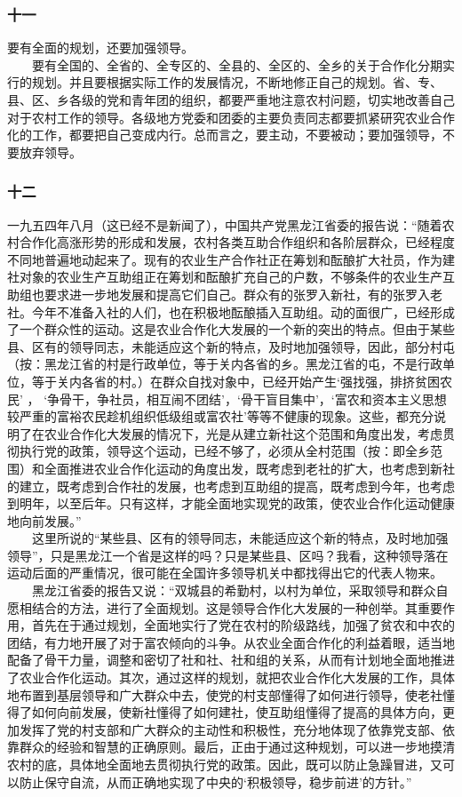 \documentclass[cn,11pt,chinese]{elegantbook}
\def\myformat#1{\hfil\hfil #1}
\begin{document}
\subsubsection*{\myformat{十一}}
要有全面的规划，还要加强领导。\\
　　要有全国的、全省的、全专区的、全县的、全区的、全乡的关于合作化分期实行的规划。并且要根据实际工作的发展情况，不断地修正自己的规划。省、专、县、区、乡各级的党和青年团的组织，都要严重地注意农村问题，切实地改善自己对于农村工作的领导。各级地方党委和团委的主要负责同志都要抓紧研究农业合作化的工作，都要把自己变成内行。总而言之，要主动，不要被动；要加强领导，不要放弃领导。\\
\subsubsection*{\myformat{十二}}
一九五四年八月（这已经不是新闻了），中国共产党黑龙江省委的报告说：“随着农村合作化高涨形势的形成和发展，农村各类互助合作组织和各阶层群众，已经程度不同地普遍地动起来了。现有的农业生产合作社正在筹划和酝酿扩大社员，作为建社对象的农业生产互助组正在筹划和酝酿扩充自己的户数，不够条件的农业生产互助组也要求进一步地发展和提高它们自己。群众有的张罗入新社，有的张罗入老社。今年不准备入社的人们，也在积极地酝酿插入互助组。动的面很广，已经形成了一个群众性的运动。这是农业合作化大发展的一个新的突出的特点。但由于某些县、区有的领导同志，未能适应这个新的特点，及时地加强领导，因此，部分村屯（按：黑龙江省的村是行政单位，等于关内各省的乡。黑龙江省的屯，不是行政单位，等于关内各省的村。）在群众自找对象中，已经开始产生‘强找强，排挤贫困农民’ ， ‘争骨干，争社员，相互闹不团结’，‘骨干盲目集中’，‘富农和资本主义思想较严重的富裕农民趁机组织低级组或富农社’等等不健康的现象。这些，都充分说明了在农业合作化大发展的情况下，光是从建立新社这个范围和角度出发，考虑贯彻执行党的政策，领导这个运动，已经不够了，必须从全村范围（按：即全乡范围）和全面推进农业合作化运动的角度出发，既考虑到老社的扩大，也考虑到新社的建立，既考虑到合作社的发展，也考虑到互助组的提高，既考虑到今年，也考虑到明年，以至后年。只有这样，才能全面地实现党的政策，使农业合作化运动健康地向前发展。”\\
　　这里所说的“某些县、区有的领导同志，未能适应这个新的特点，及时地加强领导”，只是黑龙江一个省是这样的吗？只是某些县、区吗？我看，这种领导落在运动后面的严重情况，很可能在全国许多领导机关中都找得出它的代表人物来。\\
　　黑龙江省委的报告又说：“双城县的希勤村，以村为单位，采取领导和群众自愿相结合的方法，进行了全面规划。这是领导合作化大发展的一种创举。其重要作用，首先在于通过规划，全面地实行了党在农村的阶级路线，加强了贫农和中农的团结，有力地开展了对于富农倾向的斗争。从农业全面合作化的利益着眼，适当地配备了骨干力量，调整和密切了社和社、社和组的关系，从而有计划地全面地推进了农业合作化运动。其次，通过这样的规划，就把农业合作化大发展的工作，具体地布置到基层领导和广大群众中去，使党的村支部懂得了如何进行领导，使老社懂得了如何向前发展，使新社懂得了如何建社，使互助组懂得了提高的具体方向，更加发挥了党的村支部和广大群众的主动性和积极性，充分地体现了依靠党支部、依靠群众的经验和智慧的正确原则。最后，正由于通过这种规划，可以进一步地摸清农村的底，具体地全面地去贯彻执行党的政策。因此，既可以防止急躁冒进，又可以防止保守自流，从而正确地实现了中央的‘积极领导，稳步前进’的方针。”\\
\end{document}
